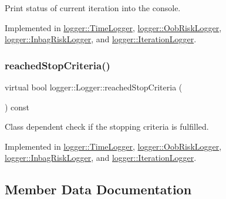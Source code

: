 Print status of current iteration into the console. 



Implemented in \mbox{\hyperlink{classlogger_1_1_time_logger_ad98f34f3584b2ac448d6a5ef69ee2af1}{logger\+::\+Time\+Logger}}, \mbox{\hyperlink{classlogger_1_1_oob_risk_logger_acab1638b5112232c86c2208b91f649fb}{logger\+::\+Oob\+Risk\+Logger}}, \mbox{\hyperlink{classlogger_1_1_inbag_risk_logger_a040213adf29a645f0fd5356b951627d0}{logger\+::\+Inbag\+Risk\+Logger}}, and \mbox{\hyperlink{classlogger_1_1_iteration_logger_ac3c13bef35391c0408eb196d01b2a286}{logger\+::\+Iteration\+Logger}}.

\mbox{\label{classlogger_1_1_logger_aed91421c07062b91cee158ef2bda7ae8}} 
\subsubsection{\texorpdfstring{reached\+Stop\+Criteria()}{reachedStopCriteria()}}
{\footnotesize\ttfamily virtual bool logger\+::\+Logger\+::reached\+Stop\+Criteria (\begin{DoxyParamCaption}{ }\end{DoxyParamCaption}) const\hspace{0.3cm}{\ttfamily [pure virtual]}}



Class dependent check if the stopping criteria is fulfilled. 



Implemented in \mbox{\hyperlink{classlogger_1_1_time_logger_a380f7e56af17c8a35d729dad1a5e3baa}{logger\+::\+Time\+Logger}}, \mbox{\hyperlink{classlogger_1_1_oob_risk_logger_a5c1c8358ffcb5f5463b43f068ea21aa4}{logger\+::\+Oob\+Risk\+Logger}}, \mbox{\hyperlink{classlogger_1_1_inbag_risk_logger_a17a7416e4cc9db4da3b3eda5012ad7c7}{logger\+::\+Inbag\+Risk\+Logger}}, and \mbox{\hyperlink{classlogger_1_1_iteration_logger_a8b66f0d8d2ddb7f15ca14e2b9150ea80}{logger\+::\+Iteration\+Logger}}.



\subsection{Member Data Documentation}
\mbox{\label{classlogger_1_1_logger_a57ca2ab531e0a7ac74f4ecd4b74a938f}} 
